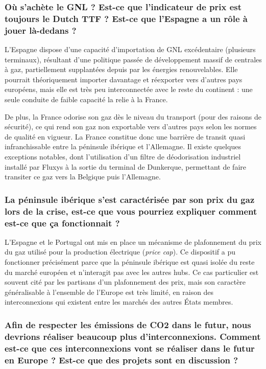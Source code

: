 \subsubsection{Où s'achète le GNL ? Est-ce que l'indicateur de prix est toujours le Dutch TTF ? Est-ce que l'Espagne a un rôle à jouer là-dedans ?}

L'Espagne dispose d'une capacité d'importation de GNL excédentaire (plusieurs terminaux), résultant d'une politique passée de développement massif de centrales à gaz, partiellement supplantées depuis par les énergies renouvelables. Elle pourrait théoriquement importer davantage et réexporter vers d'autres pays européens, mais elle est très peu interconnectée avec le reste du continent : une seule conduite de faible capacité la relie à la France.

De plus, la France odorise son gaz dès le niveau du transport (pour des raisons de sécurité), ce qui rend son gaz non exportable vers d'autres pays selon les normes de qualité en vigueur. La France constitue donc une barrière de transit quasi infranchissable entre la péninsule ibérique et l'Allemagne. Il existe quelques exceptions notables, dont l'utilisation d'un filtre de déodorisation industriel installé par Fluxys à la sortie du terminal de Dunkerque, permettant de faire transiter ce gaz vers la Belgique puis l'Allemagne.

\subsubsection{La péninsule ibérique s'est caractérisée par son prix du gaz lors de la crise, est-ce que vous pourriez expliquer comment est-ce que ça fonctionnait ?}

L'Espagne et le Portugal ont mis en place un mécanisme de plafonnement du prix du gaz utilisé pour la production électrique (\textit{price cap}). Ce dispositif a pu fonctionner précisément parce que la péninsule ibérique est quasi isolée du reste du marché européen et n'interagit pas avec les autres hubs. Ce cas particulier est souvent cité par les partisans d'un plafonnement des prix, mais son caractère généralisable à l'ensemble de l'Europe est très limité, en raison des interconnexions qui existent entre les marchés des autres États membres.

\subsubsection{Afin de respecter les émissions de CO\texorpdfstring{2}{CO2} dans le futur, nous devrions réaliser beaucoup plus d'interconnexions. Comment est-ce que ces interconnexions vont se réaliser dans le futur en Europe ? Est-ce que des projets sont en discussion ?}


